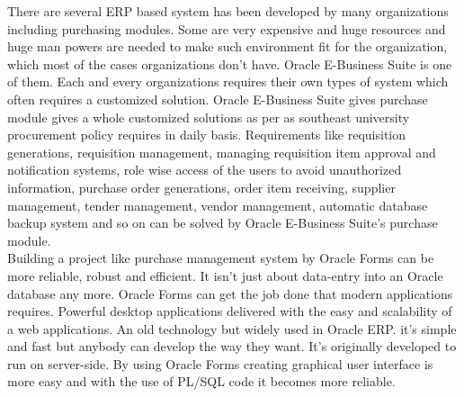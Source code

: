 \documentclass[12pt]{report} %
\begin{document}
There are several ERP based system has been developed by many organizations including purchasing modules. Some are very expensive and huge resources and huge man powers are needed to make such environment fit for the organization, which most of the cases organizations don't have. Oracle E-Business Suite is one of them. Each and every organizations requires their own types of system which often requires a customized solution. Oracle E-Business Suite gives purchase module gives a whole customized solutions as per as southeast university procurement policy requires in daily basis. Requirements like requisition generations, requisition management, managing requisition item approval and notification systems, role wise access of the users to avoid unauthorized information, purchase order generations, order item receiving, supplier management, tender management, vendor management, automatic database backup system and so on can be solved by Oracle E-Business Suite's purchase module.\cite{purchase_module_book} \label{sec:purchase_module_book_1}\\






Building a project like purchase management system by Oracle Forms can be more reliable, robust and efficient. It isn't just about data-entry into an Oracle database any more. Oracle Forms can get the job done that modern applications requires. Powerful desktop applications delivered with the easy and scalability of a web applications. An old technology but widely used in Oracle ERP. it's simple and fast but anybody can develop the way they want. It's originally developed to run on server-side. By using Oracle Forms creating graphical user interface is more easy and with the use of PL/SQL code it becomes more reliable. \cite{form_builder_book}  \label{sec:form_builder_book_1}\\
\end{document}

